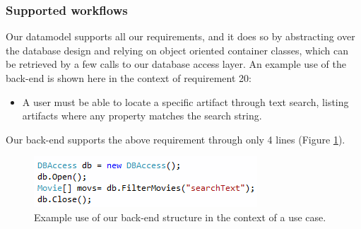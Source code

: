 \subsubsection{Supported workflows}
Our datamodel supports all our requirements, and it
does so by abstracting over the database design and relying on object oriented
container classes, which can be retrieved by a few calls to our database access
layer. An example use of the back-end is shown here in the context of requirement 20:

\begin{itemize}
\item A user must be able to locate a specific artifact through text search,
	listing artifacts where any property matches the search string.
\end{itemize}

Our back-end supports the above requirement through only 4 lines (Figure \ref{fig:moviesearch}).

\begin{figure}[hbt]
	\centering
	\includegraphics[scale=0.81]{./p1design/moviesearch.png}
	\caption{Example use of our back-end structure in the context of a use case.}
	\label{fig:moviesearch}
\end{figure}
